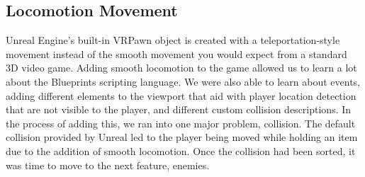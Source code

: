 \documentclass{sigchi}
\begin{document}
\subsection*{Locomotion Movement}
Unreal Engine’s built-in VRPawn object is created with a teleportation-style movement instead of the smooth movement you would expect from a standard 3D video game. Adding smooth locomotion to the game allowed us to learn a lot about the Blueprints scripting language. We were also able to learn about events, adding different elements to the viewport that aid with player location detection that are not visible to the player, and different custom collision descriptions. In the process of adding this, we ran into one major problem, collision. The default collision provided by Unreal led to the player being moved while holding an item due to the addition of smooth locomotion. Once the collision had been sorted, it was time to move to the next feature, enemies. 
\end{document}
